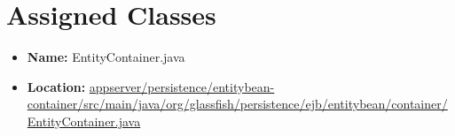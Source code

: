 \section{Assigned Classes} %
\label{sec:assigned_class}

\begin{itemize}
	\item \textbf{Name:} EntityContainer.java
	\item \textbf{Location:} \url{appserver/persistence/entitybean-container/src/main/java/org/glassfish/persistence/ejb/entitybean/container/EntityContainer.java}
\end{itemize}